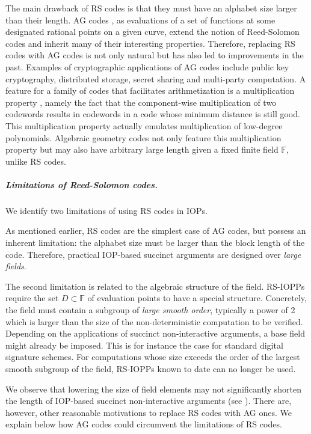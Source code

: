 \documentclass[10pt,a4paper]{article}
\newcommand\F{\mathbb{F}}
\theoremstyle{plain}
\theoremstyle{plain}
\theoremstyle{definition}
\theoremstyle{remark}
\theoremstyle{plain}
\begin{document}
The main drawback of RS codes is that they must have an alphabet size larger than their length. AG codes \cite{Goppa77}, as evaluations of a set of functions at some designated rational points on a given curve, extend the notion of Reed-Solomon codes and inherit many of their interesting properties. Therefore, replacing RS codes with AG codes is not only natural but has also led to improvements in the past. Examples of cryptographic applications of AG codes include public key cryptography, distributed storage, secret sharing and multi-party computation. A feature for a family of codes that facilitates arithmetization is a multiplication property \cite{Mei13}, namely the fact that the component-wise multiplication of two codewords results in codewords in a code whose minimum distance is still good. This multiplication property actually emulates multiplication of low-degree polynomials. Algebraic geometry codes not only feature this multiplication property but may also have arbitrary large length given a fixed finite field $\F$, unlike RS codes. 


\subparagraph*{Limitations of Reed-Solomon codes.}
We identify two limitations of using RS codes in IOPs.

As mentioned earlier, RS codes are the simplest case of AG codes, but possess an inherent limitation: the alphabet size must be larger than the block length of the code. Therefore, practical IOP-based succinct arguments are designed over \emph{large fields}.

The second limitation is related to the algebraic structure of the field. RS-IOPPs \cite{BS08, BBHR18a} require the set $D \subset \F$ of evaluation points to have a special structure. Concretely,
the field must contain a subgroup of \emph{large smooth order}, typically a power of 2 which is larger than the size of the non-deterministic computation to be verified. Depending on the applications of succinct non-interactive arguments, a base field might already be imposed. This is for instance the case for standard digital signature schemes. For computations whose size exceeds the order of the largest smooth subgroup of the field, RS-IOPPs known to date can no longer be used.    

We observe that lowering the size of field elements may not significantly shorten the length of IOP-based succinct non-interactive arguments (see \cite{BCS16}). There are, however, other reasonable motivations to replace RS codes with AG ones. We explain below how AG codes could circumvent the limitations of RS codes.
\end{document}
